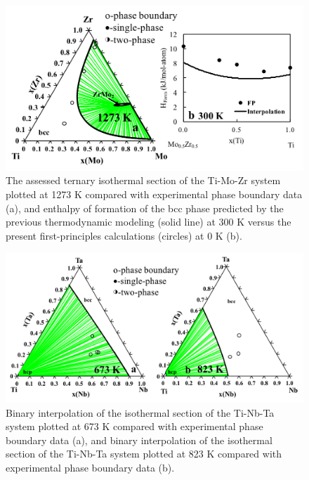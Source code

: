 \newpage
\begin{figure}[H]
	\centering
	\includegraphics[width=\textwidth]{Chapter-3/Figures/TiMoZr.png}
	\caption{The assessed ternary isothermal section of the Ti-Mo-Zr system plotted at 1273 K compared with experimental phase boundary data \cite{Kar2008,Prokoshkin1967} (a), and enthalpy of formation of the bcc phase predicted by the previous thermodynamic modeling (solid line) at 300 K versus the present first-principles calculations (circles) at 0 K (b).}
	\label{Ch3-figure:TiMoZr}
\end{figure}

\newpage
\begin{figure}[H]
	\centering
	\includegraphics[width=\textwidth]{Chapter-3/Figures/TiNbTa1.png}
	\caption{Binary interpolation of the isothermal section of the Ti-Nb-Ta system plotted at 673 K compared with experimental phase boundary data \cite{Na2001} (a), and binary interpolation of the isothermal section of the Ti-Nb-Ta system plotted at 823 K compared with experimental phase boundary data \cite{Na2001} (b).}
	\label{Ch3-figure:TiNbTa1}
\end{figure}


